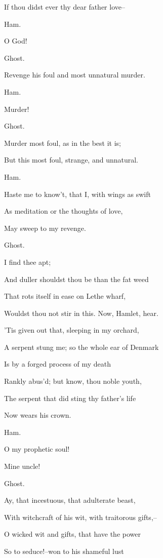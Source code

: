 \documentclass[12pt]{book}
\begin{document}
If thou didst ever thy dear father love--



Ham.

O God!



Ghost.

Revenge his foul and most unnatural murder.



Ham.

Murder!



Ghost.

Murder most foul, as in the best it is;

But this most foul, strange, and unnatural.



Ham.

Haste me to know't, that I, with wings as swift

As meditation or the thoughts of love,

May sweep to my revenge.



Ghost.

I find thee apt;

And duller shouldst thou be than the fat weed

That rots itself in ease on Lethe wharf,

Wouldst thou not stir in this. Now, Hamlet, hear.

'Tis given out that, sleeping in my orchard,

A serpent stung me; so the whole ear of Denmark

Is by a forged process of my death

Rankly abus'd; but know, thou noble youth,

The serpent that did sting thy father's life

Now wears his crown.



Ham.

O my prophetic soul!

Mine uncle!



Ghost.

Ay, that incestuous, that adulterate beast,

With witchcraft of his wit, with traitorous gifts,--

O wicked wit and gifts, that have the power

So to seduce!--won to his shameful lust
\end{document}
